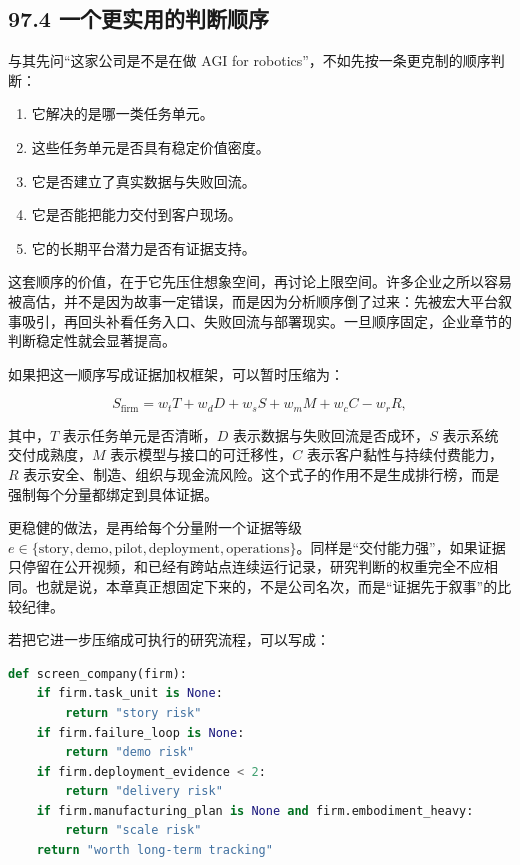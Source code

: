 \subsection*{97.4 一个更实用的判断顺序}


与其先问“这家公司是不是在做 AGI for robotics”，不如先按一条更克制的顺序判断：

\begin{enumerate}
\item 它解决的是哪一类任务单元。
\item 这些任务单元是否具有稳定价值密度。
\item 它是否建立了真实数据与失败回流。
\item 它是否能把能力交付到客户现场。
\item 它的长期平台潜力是否有证据支持。
\end{enumerate}

这套顺序的价值，在于它先压住想象空间，再讨论上限空间。许多企业之所以容易被高估，并不是因为故事一定错误，而是因为分析顺序倒了过来：先被宏大平台叙事吸引，再回头补看任务入口、失败回流与部署现实。一旦顺序固定，企业章节的判断稳定性就会显著提高。

如果把这一顺序写成证据加权框架，可以暂时压缩为：

\begingroup
\footnotesize
\begin{equation*}
S_{\text{firm}} = w_t T + w_d D + w_s S + w_m M + w_c C - w_r R,
\end{equation*}
\endgroup

其中，\(T\) 表示任务单元是否清晰，\(D\) 表示数据与失败回流是否成环，\(S\) 表示系统交付成熟度，\(M\) 表示模型与接口的可迁移性，\(C\) 表示客户黏性与持续付费能力，\(R\) 表示安全、制造、组织与现金流风险。这个式子的作用不是生成排行榜，而是强制每个分量都绑定到具体证据。

更稳健的做法，是再给每个分量附一个证据等级 \(\scriptstyle e \in \{\text{story}, \text{demo}, \text{pilot}, \text{deployment}, \text{operations}\}\)。同样是“交付能力强”，如果证据只停留在公开视频，和已经有跨站点连续运行记录，研究判断的权重完全不应相同。也就是说，本章真正想固定下来的，不是公司名次，而是“证据先于叙事”的比较纪律。

若把它进一步压缩成可执行的研究流程，可以写成：

\begin{lstlisting}[language=python]
def screen_company(firm):
    if firm.task_unit is None:
        return "story risk"
    if firm.failure_loop is None:
        return "demo risk"
    if firm.deployment_evidence < 2:
        return "delivery risk"
    if firm.manufacturing_plan is None and firm.embodiment_heavy:
        return "scale risk"
    return "worth long-term tracking"
\end{lstlisting}

